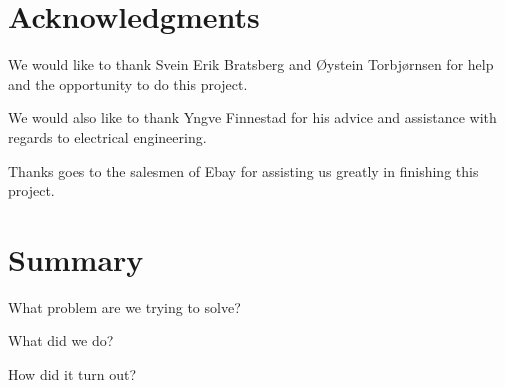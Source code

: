 \clearpage
\section{Acknowledgments}
We would like to thank Svein Erik Bratsberg and \O ystein Torbj\o rnsen for help and the opportunity to do this project.

We would also like to thank Yngve Finnestad for his advice and assistance with regards to electrical engineering.

Thanks goes to the salesmen of Ebay for assisting us greatly in finishing this project.

\section{Summary}

What problem are we trying to solve?

What did we do?

How did it turn out?


